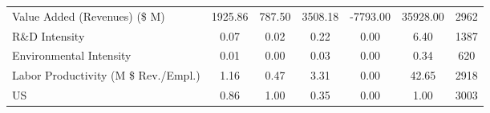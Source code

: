 {\begin{tabular}{l*{1}{cccccc}}
Value Added (Revenues) (\$ M)&     1925.86&      787.50&     3508.18&    -7793.00&    35928.00&        2962\\
R\&D Intensity      &        0.07&        0.02&        0.22&        0.00&        6.40&        1387\\
Environmental Intensity&        0.01&        0.00&        0.03&        0.00&        0.34&         620\\
Labor Productivity (M \$ Rev./Empl.)&        1.16&        0.47&        3.31&        0.00&       42.65&        2918\\
US                  &        0.86&        1.00&        0.35&        0.00&        1.00&        3003\\
\hline\hline
\end{tabular}
}
